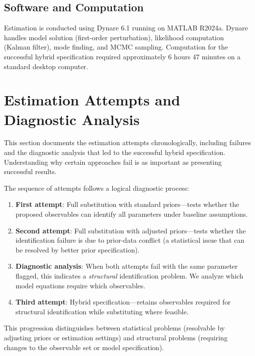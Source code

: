 \documentclass[12pt]{article}
\begin{document}
\subsection{Software and Computation}

Estimation is conducted using Dynare 6.1 running on MATLAB R2024a. Dynare handles model solution (first-order perturbation), likelihood computation (Kalman filter), mode finding, and MCMC sampling. Computation for the successful hybrid specification required approximately 6 hours 47 minutes on a standard desktop computer.

\section{Estimation Attempts and Diagnostic Analysis}

This section documents the estimation attempts chronologically, including failures and the diagnostic analysis that led to the successful hybrid specification. Understanding why certain approaches fail is as important as presenting successful results.

The sequence of attempts follows a logical diagnostic process:
\begin{enumerate}
    \item \textbf{First attempt}: Full substitution with standard priors---tests whether the proposed observables can identify all parameters under baseline assumptions.
    \item \textbf{Second attempt}: Full substitution with adjusted priors---tests whether the identification failure is due to prior-data conflict (a statistical issue that can be resolved by better prior specification).
    \item \textbf{Diagnostic analysis}: When both attempts fail with the same parameter flagged, this indicates a \textit{structural} identification problem. We analyze which model equations require which observables.
    \item \textbf{Third attempt}: Hybrid specification---retains observables required for structural identification while substituting where feasible.
\end{enumerate}

This progression distinguishes between statistical problems (resolvable by adjusting priors or estimation settings) and structural problems (requiring changes to the observable set or model specification).
\end{document}
